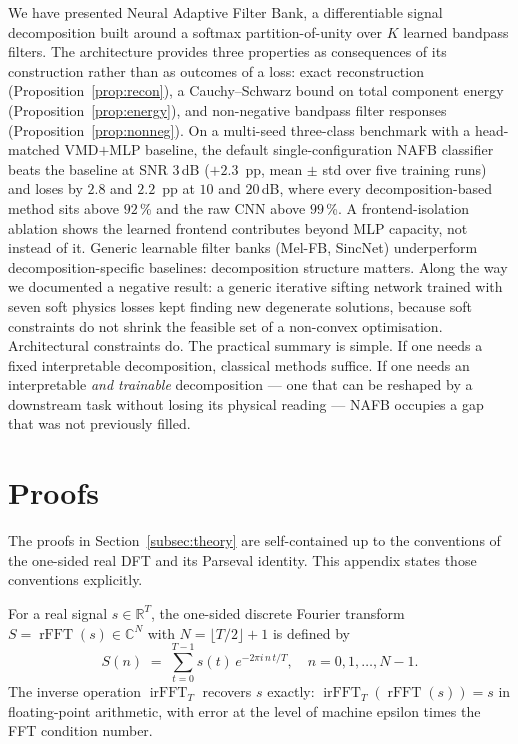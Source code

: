 \documentclass[journal]{IEEEtran}
\theoremstyle{remark}
\newcommand{\R}{\mathbb{R}}
\newcommand{\C}{\mathbb{C}}
\DeclareMathOperator{\rFFT}{rFFT}
\DeclareMathOperator{\irFFT}{irFFT}
\begin{document}
We have presented Neural Adaptive Filter Bank, a differentiable
signal decomposition built around a softmax partition-of-unity over
$K$ learned bandpass filters. The architecture provides three
properties as consequences of its construction rather than as outcomes
of a loss: exact reconstruction (Proposition~\ref{prop:recon}), a
Cauchy--Schwarz bound on total component energy
(Proposition~\ref{prop:energy}), and non-negative bandpass filter
responses (Proposition~\ref{prop:nonneg}). On a multi-seed three-class
benchmark with a head-matched VMD$+$MLP baseline, the default
single-configuration NAFB classifier beats the baseline at SNR
$3$\,dB ($+2.3$~pp, mean $\pm$ std over five training runs) and
loses by $2.8$ and $2.2$~pp at $10$ and $20$\,dB, where every
decomposition-based method sits above $92$\,\% and the raw CNN above
$99$\,\%. A
frontend-isolation ablation shows the learned frontend contributes
beyond MLP capacity, not instead of it. Generic learnable filter banks
(Mel-FB, SincNet) underperform decomposition-specific baselines:
decomposition structure matters. Along the way we
documented a negative result: a generic iterative sifting network
trained with seven soft physics losses kept finding new degenerate
solutions, because soft constraints do not shrink the feasible set of
a non-convex optimisation. Architectural constraints do. The practical
summary is simple. If one needs a fixed interpretable decomposition,
classical methods suffice. If one needs an interpretable
\emph{and trainable} decomposition --- one that can be reshaped by a
downstream task without losing its physical reading --- NAFB
occupies a gap that was not previously filled.

\appendices

\section{Proofs}
\label{app:proofs}

The proofs in Section~\ref{subsec:theory} are self-contained up to the
conventions of the one-sided real DFT and its Parseval identity. This
appendix states those conventions explicitly.

For a real signal $s \in \R^{T}$, the one-sided discrete Fourier
transform $S = \rFFT(s) \in \C^{N}$ with $N = \lfloor T/2\rfloor + 1$
is defined by
\begin{equation}
S(n) \;=\; \sum_{t=0}^{T-1} s(t)\,
  e^{-2\pi i\,n\,t / T},\quad n = 0, 1, \ldots, N-1 .
\end{equation}
The inverse operation $\irFFT_{T}$ recovers $s$ exactly:
$\irFFT_{T}(\rFFT(s)) = s$ in floating-point arithmetic, with error at
the level of machine epsilon times the FFT condition number.
\end{document}
